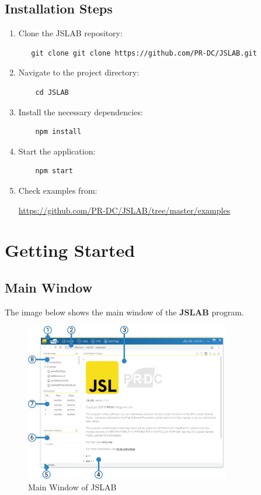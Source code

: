 \documentclass[12pt,a4paper]{article}
\begin{document}
\subsection{Installation Steps}
\begin{enumerate}
    \item Clone the JSLAB repository:
\begin{verbatim}
   git clone git clone https://github.com/PR-DC/JSLAB.git
\end{verbatim}
    
    \item Navigate to the project directory:
\begin{verbatim}
    cd JSLAB
\end{verbatim}

    \item Install the necessary dependencies:
\begin{verbatim}
    npm install
\end{verbatim}

    \item Start the application:
\begin{verbatim}
    npm start
\end{verbatim}

    \item Check examples from:

    \url{https://github.com/PR-DC/JSLAB/tree/master/examples}

\end{enumerate}

\section{Getting Started}

\subsection{Main Window}
\label{sec:main-window}

The image below shows the main window of the \textbf{JSLAB} program.

\begin{figure}[H]
    \centering
    \includegraphics[width=0.8\textwidth]{resources/JSLAB_main_window.png}
    \caption{Main Window of JSLAB}
    \label{fig:main-window}
\end{figure}
\end{document}
